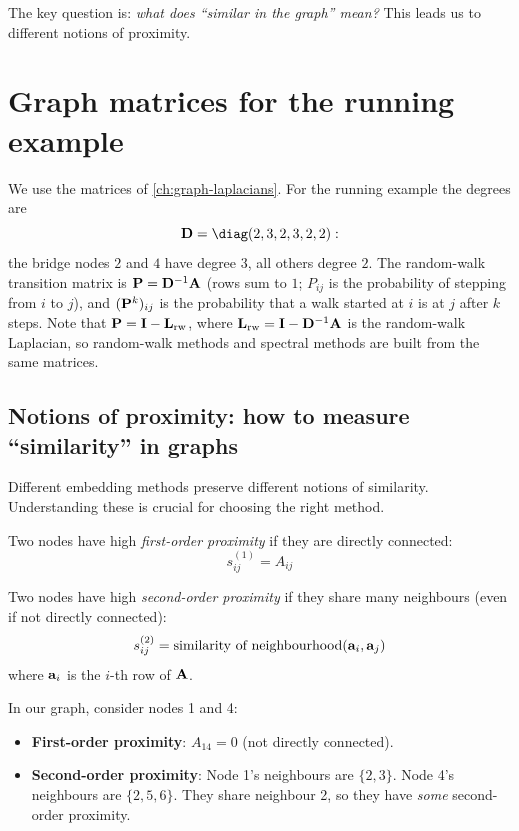 \begin{notechapter}
The key question is: \emph{what does ``similar in the graph'' mean?} This leads us to different notions of proximity.

\section{Graph matrices for the running example}

We use the matrices of \cref{ch:graph-laplacians}. For the running example the degrees are
\[
\degree = \diag(2, 3, 2, 3, 2, 2):
\]
the bridge nodes $2$ and $4$ have degree $3$, all others degree $2$. The random-walk transition matrix is $\mathbf{P} = \mathbf{D}^{-1}\mathbf{A}$ (rows sum to $1$; $P_{ij}$ is the probability of stepping from $i$ to $j$), and $(\mathbf{P}^k)_{ij}$ is the probability that a walk started at $i$ is at $j$ after $k$ steps. Note that $\mathbf{P} = \mathbf{I} - \mathbf{L}_{\text{rw}}$, where $\mathbf{L}_{\text{rw}} = \mathbf{I} - \mathbf{D}^{-1}\mathbf{A}$ is the random-walk Laplacian, so random-walk methods and spectral methods are built from the same matrices.

\subsection{Notions of proximity: how to measure ``similarity'' in graphs}

Different embedding methods preserve different notions of similarity. Understanding these is crucial for choosing the right method.

\begin{definition}
Two nodes have high \emph{first-order proximity} if they are directly connected:
\[
s^{(1)}_{ij} = A_{ij}
\]
\end{definition}

\begin{definition}
Two nodes have high \emph{second-order proximity} if they share many neighbours (even if not directly connected):
\[
s^{(2)}_{ij} = \text{similarity of neighbourhood}(\mathbf{a}_i, \mathbf{a}_j)
\]
where $\mathbf{a}_i$ is the $i$-th row of $\mathbf{A}$.
\end{definition}

\begin{example}
In our graph, consider nodes 1 and 4:
\begin{itemize}
    \item \textbf{First-order proximity}: $A_{14} = 0$ (not directly connected).
    \item \textbf{Second-order proximity}: Node 1's neighbours are $\{2, 3\}$. Node 4's neighbours are $\{2, 5, 6\}$. They share neighbour 2, so they have \emph{some} second-order proximity.
\end{itemize}


\end{example}
\end{notechapter}
